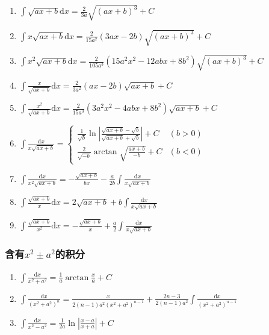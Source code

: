 \documentclass{book}
\begin{document}
\begin{enumerate}

\item $ \int \sqrt{ax+b} \mathrm{d}x = \frac{2}{3a} \sqrt{(ax+b)^3} + C $

\item $ \int x \sqrt{ax+b} \mathrm{d}x = \frac{2}{15a^2}(3ax-2b) \sqrt{(ax+b)^3} + C $

\item $ \int x^2 \sqrt{ax+b} \mathrm{d}x = \frac{2}{105a^3}(15a^2x^2-12abx+8b^2)\sqrt{(ax+b)^3} + C $

\item $ \int \frac{x}{\sqrt{ax+b}} \mathrm{d}x = \frac{2}{3a^2} (ax-2b) \sqrt{ax+b} + C $

\item $ \int \frac{x^2}{\sqrt{ax+b}} \mathrm{d} x = \frac{2}{15a^3} (3a^2x^2 - 4abx + 8b^2) \sqrt{ax+b} + C $

\item $ \int \frac{\mathrm{d} x}{x\sqrt{ax+b}} = \begin{cases}
\frac{1}{\sqrt{b}}\ln\left| \frac{\sqrt{ax+b} - \sqrt{b}}{\sqrt{ax+b} + \sqrt{b}} \right| + C & (b>0) \\
\frac{2}{\sqrt{-b}}\arctan\sqrt{\frac{ax+b}{-b}} + C & (b<0)
\end{cases} $

\item $ \int \frac{\mathrm{d} x}{x^2\sqrt{ax+b}} = -\frac{\sqrt{ax+b}}{bx} - \frac{a}{2b} \int \frac{\mathrm{d} x}{x\sqrt{ax+b}} $

\item $ \int \frac{\sqrt{ax+b}}{x}\mathrm{d} x = 2\sqrt{ax+b} + b\int\frac{\mathrm{d} x}{x\sqrt{ax+b}} $

\item $ \int \frac{\sqrt{ax+b}}{x^2}\mathrm{d}x = -\frac{\sqrt{ax+b}}{x} + \frac{a}{2} \int \frac{\mathrm{d}x}{x\sqrt{ax+b}} $

\end{enumerate}

\subsubsection{含有$x^2 \pm a^2$的积分}

\begin{enumerate}

\item $ \int \frac{\mathrm{d}x}{x^2 + a^2} = \frac{1}{a} \arctan\frac{x}{a} + C$

\item $ \int \frac{\mathrm{d}x}{(x^2+a^2)^n} = \frac{x}{2(n-1)a^2(x^2+a^2)^{n-1}}+\frac{2n-3}{2(n-1)a^2} \int \frac{\mathrm{d}x}{(x^2+a^2)^{n-1}} $

\item $\int \frac{\mathrm{d}x}{x^2-a^2} = \frac{1}{2a}\ln\left| \frac{x-a}{x+a} \right| + C $


\end{enumerate}
\end{document}
